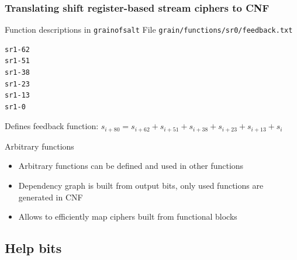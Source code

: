 \documentclass[xcolor=usenames,xcolor=svgnames,table,slidestop,compress,mathserif]{beamer}
\begin{document}
{%
}

\begin{frame}[fragile]
\frametitle{Translating shift register-based stream ciphers to CNF}

\begin{beamerboxesrounded}[shadow=true]{Function descriptions in \texttt{grainofsalt}}
File \texttt{grain/functions/sr0/feedback.txt}
{\small\begin{verbatim}
sr1-62
sr1-51
sr1-38
sr1-23
sr1-13
sr1-0
\end{verbatim}}
Defines feedback function:
$s_{i+80} = s_{i+62} + s_{i+51} + s_{i+38} + s_{i+23} + s_{i+13} + s_i$
\end{beamerboxesrounded}

\begin{beamerboxesrounded}[shadow=true]{Arbitrary functions}
\begin{itemize}
 \item Arbitrary functions can be defined and used in other functions
 \item Dependency graph is built from output bits, only used functions are generated in CNF
 \item Allows to efficiently map ciphers built from functional blocks
\end{itemize}
\end{beamerboxesrounded}

\end{frame}

\subsection{Help bits}
\end{document}
